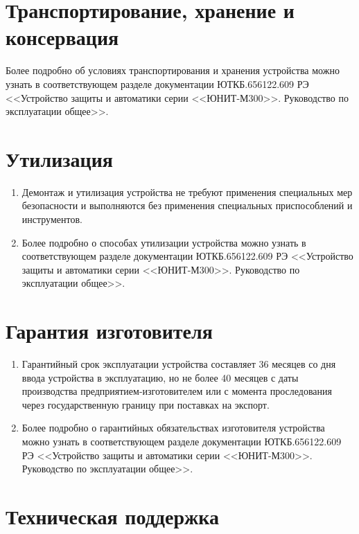\documentclass[a4paper, 12pt,table, hidelinks, DIV=calc]{extarticle} %
\begin{document}
\vspace{5mm}
\color{uniblue}\section[Транспортирование, хранение и консервация]{Транспортирование, хранение и консервация}\label{sec:trans}
\color{black}


Более подробно об условиях транспортирования и хранения устройства можно узнать в соответствующем разделе документации ЮТКБ.656122.609 РЭ <<Устройство защиты и автоматики серии <<ЮНИТ-М300>>. Руководство по эксплуатации общее>>. 

\vspace{3mm}
\color{uniblue}\section[Утилизация]{Утилизация}\label{sec:util}
\color{black}

\begin{enumerate}[label=\arabic{section}.\arabic*, labelsep=4pt, leftmargin=0pt, itemindent=57pt]

\item
Демонтаж и утилизация устройства не требуют применения специальных мер безопасности и выполняются без применения специальных приспособлений и инструментов.
\item
Более подробно о способах утилизации устройства можно узнать в соответствующем разделе документации ЮТКБ.656122.609 РЭ <<Устройство защиты и автоматики серии <<ЮНИТ-М300>>. Руководство по эксплуатации общее>>.

\end{enumerate}

\vspace{3mm}
\color{uniblue}\section[Гарантия изготовителя]{Гарантия изготовителя}\label{sec:garantee}
\color{black}

\begin{enumerate}[label=\arabic{section}.\arabic*, labelsep=4pt, leftmargin=0pt, itemindent=57pt]

\item
Гарантийный срок эксплуатации устройства составляет 36 месяцев со дня ввода устройства в эксплуатацию, но не более 40 месяцев с даты производства предприятием-изготовителем или с момента проследования через государственную границу при поставках на экспорт.
\item
Более подробно о гарантийных обязательствах изготовителя устройства можно узнать в соответствующем разделе документации ЮТКБ.656122.609 РЭ <<Устройство защиты и автоматики серии <<ЮНИТ-М300>>. Руководство по эксплуатации общее>>. 

\end{enumerate}\vspace{3mm}
\color{uniblue}\section[Техническая поддержка]{Техническая поддержка}\label{sec:support}
\color{black}
\end{document}
